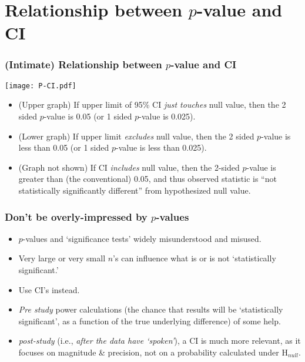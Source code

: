 \documentclass[10pt]{beamer}\usepackage[]{graphicx}\usepackage[]{color}
\begin{document}
\section{Relationship between $p$-value and CI}

\begin{frame}
	\frametitle{(Intimate) Relationship between $p$-value and CI}
	\begin{center}
		\texttt{[image: P-CI.pdf]}
	\end{center} 
	\begin{footnotesize}
		\begin{itemize}
			\item
			(Upper graph) If upper limit of 95\% CI\textit{ just touches} null value, then
			the 2 sided $p$-value is 0.05 (or 1 sided $p$-value is 0.025). \pause
			\item
			(Lower graph) If upper limit \textit{excludes} null value, then
			the 2 sided $p$-value is less than 0.05 (or 1 sided $p$-value is less than 0.025). \pause
			\item
			(Graph not shown) If  CI \textit{includes} null value, then the 2-sided $p$-value is greater than (the conventional) 0.05, and thus observed statistic is ``not statistically significantly different'' from hypothesized null value. 
		\end{itemize}
	\end{footnotesize}
\end{frame}

\begin{frame}
	\frametitle{Don't be overly-impressed by $p$-values}
	\begin{itemize}
		\setlength\itemsep{0.5em}
		\item
		$p$-values and `significance tests' widely misunderstood and misused.
		\item
		Very large or very small $n$'s can influence what is or is not `statistically significant.'
		\item
		Use CI's instead.
		\item
		\textit{Pre study} power calculations (the chance that results will be `statistically significant', as a
		function of the true underlying difference) of some help.
		\item
		\textit{post-study} (i.e., \textit{after the data have `spoken'}), a CI is much more relevant,
		as it focuses on magnitude \& precision, not on a probability calculated under H$_{null}.$
	\end{itemize}
\end{frame}
\end{document}
